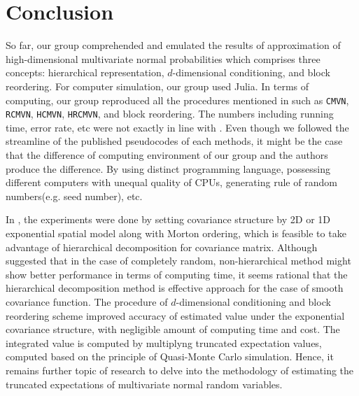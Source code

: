 \section{Conclusion}

So far, our group comprehended and emulated the results of approximation of high-dimensional multivariate normal probabilities which comprises three concepts: hierarchical representation, $d$-dimensional conditioning, and block reordering. For computer simulation, our group used Julia. In terms of computing, our group reproduced all the procedures mentioned in \citet{cao2019hierarchical} such as \texttt{CMVN}, \texttt{RCMVN}, \texttt{HCMVN}, \texttt{HRCMVN}, and block reordering. The numbers including running time, error rate, etc were not exactly in line with \citet{cao2019hierarchical}. Even though we followed the streamline of the published pseudocodes of each methods, it might be the case that the difference of computing environment of our group and the authors produce the difference. By using distinct programming language, possessing different computers with unequal quality of CPUs, generating rule of random numbers(e.g. seed number), etc.

In \citet{cao2019hierarchical}, the experiments were done by setting covariance structure by 2D or 1D exponential spatial model along with Morton ordering, which is feasible to take advantage of hierarchical decomposition for covariance matrix. Although \citet{cao2019hierarchical} suggested that in the case of completely random, non-hierarchical method might show better performance in terms of computing time, it seems rational that the hierarchical decomposition method is effective approach for the case of smooth covariance function. The procedure of $d$-dimensional conditioning and block reordering scheme improved accuracy of estimated value under the exponential covariance structure, with negligible amount of computing time and cost. The integrated value is computed by multiplyng truncated expectation values, computed based on the principle of Quasi-Monte Carlo simulation. Hence, it remains further topic of research to delve into the methodology of estimating the truncated expectations of multivariate normal random variables. 